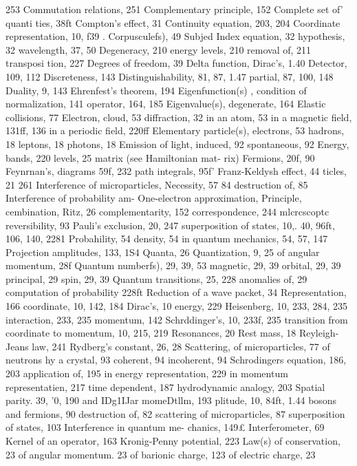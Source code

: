 \documentclass[a4paper,sfsidenotes,colorlinks=true]{tufte-book}
\numberwithin{equation}{section}
\numberwithin{figure}{section}
\begin{document}
{{{{{{{253 Commutation relations, 251 Complementary principle, 152 Complete	set	of' quanti ties,	38ft Compton's effect, 31 Continuity equation, 203, 204 Coordinate representation, 10,
f39	. Corpusculefs), 49
Subjed Index
equation, 32 hypothesis, 32 wavelength, 37, 50
Degeneracy, 210 energy levels, 210 removal of, 211
transposi tion,	227 Degrees of freedom, 39 Delta function, Dirac's, 1.40 Detector, 109, 112 Discreteness, 143 Distinguishability, 81, 87, 1.47
partial, 87, 100, 148 Duality, 9, 143
Ehrenfest's theorem, 194 Eigenfunction(s) ,
condition of normalization, 141
operator, 164, 185 Eigenvalue(s),
degenerate, 164 Elastic collisions, 77 Electron,
cloud, 53 diffraction, 32 in an atom, 53 in a magnetic field, 131ff, 136 in a periodic field, 220ff
Elementary particle(s), electrons, 53 hadrons, 18 leptons, 18
photons, 18 Emission of light,
induced, 92
spontaneous, 92 Energy,
bands, 220 levels, 25 matrix (see Hamiltonian mat-
rix)
Fermions, 20f, 90 Feynrnan's,
diagrams 59f, 232
path integrals, 95f' Franz-Keldysh effect, 44
ticles, 21
261
Interference of microparticles, Necessity, 57 84
destruction of, 85 Interference of probability am- One-electron approximation,
Principle, cembination, Ritz, 26 complementarity, 152 correspondence, 244
mlcrcscoptc reversibility, 93 Pauli's exclusion, 20, 247 superposition of states, 10,.
40, 96ft, 106, 140, 2281 Probahility, 54
density, 54 in quantum mechanics, 54,
57, 147 Projection amplitudes, 133, 1S4
Quanta, 26 Quantization, 9, 25
of angular momentum, 28f Quantum numberfs), 29, 39, 53
magnetic, 29, 39 orbital, 29, 39 principal, 29 spin, 29, 39
Quantum transitions, 25, 228 anomalies of, 29 computation of probability
228ft Reduction of a wave packet, 34
Representation, 166 coordinate, 10, 142, 184 Dirac's, 10 energy, 229
Heisenberg, 10, 233, 284, 235 interaction, 233, 235 momentum, 142 Schrddinger's, 10, 233f, 235 transition from coordinate to
momentum, 10, 215,
219 Resonances, 20
Rest mass, 18 Reyleigh-Jeans law, 241 Rydberg's constant, 26, 28
Scattering, of microparticles, 77 of neutrons hy a crystal, 93
coherent, 94
incoherent, 94 Schrodingers equation, 186, 203
application of, 195 in energy representation, 229 in momentum representatien,
217 time dependent, 187
hydrodynamic analogy, 203 Spatial parity. 39, '0, 190 and IDg1IJar momeDtllm, 193
plitude, 10, 84ft, 1.44 bosons and fermions, 90 destruction of, 82 scattering of microparticles,
87
superposition of states, 103 Interference in quantum me-
chanics, 149£ Interferometer, 69
Kernel of an operator, 163 Kronig-Penny potential, 223
Law(s) of conservation, 23 of angular momentum. 23 of barionic charge, 123 of electric charge, 23
}}}}}}}
\end{document}
